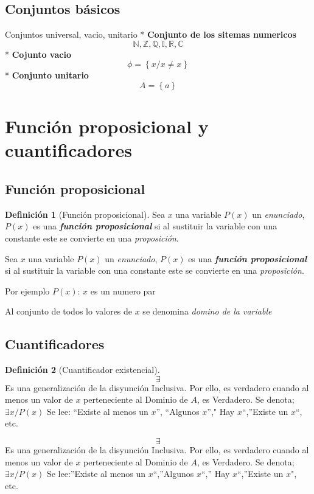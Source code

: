 \documentclass[16pt,]{krantz}
\theoremstyle{definition}
\newtheorem{definition}{Definición}[chapter]
\theoremstyle{definition}
\theoremstyle{definition}
\theoremstyle{definition}
\theoremstyle{remark}
\begin{document}
\hypertarget{conjuntos-buxe1sicos}{%
\subsection{Conjuntos básicos}\label{conjuntos-buxe1sicos}}

Conjuntos universal, vacio, unitario
* \textbf{Conjunto de los sitemas numericos}
\[
\mathbb{N}, \mathbb{Z}, \mathbb{Q}, \mathbb{I}, \mathbb{R}, \mathbb{C}
\]
* \textbf{Cojunto vacio}
\[
\phi=\left\{x/x\neq x\right\}
\]
* \textbf{Conjunto unitario}
\[
A=\left\{a\right\}
\]

\hypertarget{funciuxf3n-proposicional-y-cuantificadores}{%
\section{Función proposicional y cuantificadores}\label{funciuxf3n-proposicional-y-cuantificadores}}

\hypertarget{funciuxf3n-proposicional}{%
\subsection{Función proposicional}\label{funciuxf3n-proposicional}}

\begin{definition}[Función proposicional]
\protect\hypertarget{def:proposicional}{}{\label{def:proposicional} \iffalse (Función proposicional) \fi{} }Sea \(x\) una variable \(P(x)\) un \emph{enunciado}, \(P(x)\) es una \textbf{\emph{función proposicional}} si al sustituir la variable con una constante este se convierte en una \emph{proposición}.
\end{definition}
Sea \(x\) una variable \(P(x)\) un \emph{enunciado}, \(P(x)\) es una \textbf{\emph{función proposicional}} si al sustituir la variable con una constante este se convierte en una \emph{proposición}.

Por ejemplo \(P(x)\): \(x\) es un numero par

Al conjunto de todos lo valores de \(x\) se denomina \emph{domino de la variable}

\hypertarget{cuantificadores}{%
\subsection{Cuantificadores}\label{cuantificadores}}

\begin{definition}[Cuantificador existencial]
\protect\hypertarget{def:existencial}{}{\label{def:existencial} \iffalse (Cuantificador existencial) \fi{} }\[\exists\] Es una generalización de la disyunción Inclusiva. Por ello, es verdadero cuando al menos un valor de \(x\) perteneciente al Dominio de \(A\), es Verdadero. Se denota; \(\exists x / P (x)\) Se lee: ``Existe al menos un \(x\)'', ``Algunos \(x\)''," Hay \(x\)``,''Existe un \(x\)``, etc.
\end{definition}
\[\exists\] Es una generalización de la disyunción Inclusiva. Por ello, es verdadero cuando al menos un valor de \(x\) perteneciente al Dominio de \(A\), es Verdadero. Se denota; \(\exists x / P (x)\) Se lee:''Existe al menos un \(x\)``,''Algunos \(x\)``,'' Hay \(x\)``,''Existe un \(x\)", etc.
\end{document}

